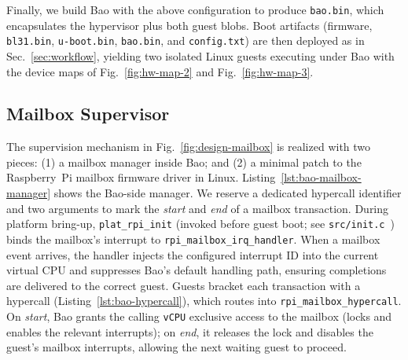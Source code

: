 Finally, we build Bao with the above configuration to produce
\lstinline{bao.bin}, which encapsulates the hypervisor plus both guest blobs.
Boot artifacts (firmware, \lstinline{bl31.bin}, \lstinline{u-boot.bin},
\lstinline{bao.bin}, and \lstinline{config.txt}) are then deployed as in
Sec.~\ref{sec:workflow}, yielding two isolated Linux guests executing under Bao
with the device maps of Fig.~\ref{fig:hw-map-2} and Fig.~\ref{fig:hw-map-3}.

\subsection{Mailbox Supervisor}
The supervision mechanism in Fig.~\ref{fig:design-mailbox} is realized with two pieces:
(1) a mailbox manager inside Bao; and (2) a minimal patch to the Raspberry~Pi
mailbox firmware driver in Linux.
%
Listing~\ref{lst:bao-mailbox-manager} shows the Bao-side manager. We reserve a
dedicated hypercall identifier and two arguments to mark the \emph{start} and
\emph{end} of a mailbox transaction. During platform bring-up,
\lstinline{plat_rpi_init} (invoked before guest boot; see
\lstinline{src/init.c}~\cite{thesis-sw-github}) binds the mailbox’s interrupt to
\lstinline{rpi_mailbox_irq_handler}. When a mailbox event arrives, the handler
injects the configured interrupt ID into the current virtual CPU and suppresses
Bao's default handling path, ensuring completions are delivered to the correct
guest. Guests bracket each transaction with a hypercall
(Listing~\ref{lst:bao-hypercall}), which routes into
\lstinline{rpi_mailbox_hypercall}. On \emph{start}, Bao grants the calling
\lstinline{vCPU} exclusive access to the mailbox (locks and enables the relevant
interrupts); on \emph{end}, it releases the lock and disables the guest’s mailbox
interrupts, allowing the next waiting guest to proceed.

\begin{longlisting}
\centering
\inputminted[]{c}{./listing/rpi_firmware.c}
\caption[SSPFS: mailbox manager added to Bao]{SSPFS: Mailbox manager added to
  Bao (see \lstinline{src/rpi_firmware.c}~\cite{thesis-sw-github})}
\label{lst:bao-mailbox-manager}
\end{longlisting}

\begin{longlisting}
\centering
\inputminted[]{c}{./listing/hypercall.c}
\caption[SSPFS: Bao hypercall manager]{SSPFS: Bao hypercall manager (see
  \lstinline{src/hypercall.c}~\cite{thesis-sw-github})}
\label{lst:bao-hypercall}
\end{longlisting}

